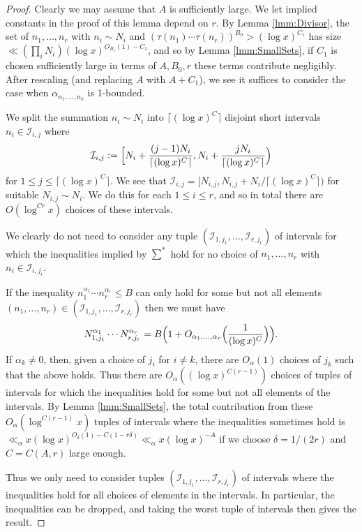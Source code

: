 \documentclass[10pt]{amsart}
\theoremstyle{plain}
\numberwithin{equation}{section}
\begin{document}
\begin{proof}
Clearly we may assume that $A$ is sufficiently large. We let implied constants in the proof of this lemma depend on $r$. By Lemma \ref{lmm:Divisor}, the set of $n_1,\dots,n_r$ with $n_i\sim N_i$ and $(\tau(n_1)\cdots \tau(n_r))^{B_0}>(\log{x})^{C_1}$ has size $\ll (\prod_i N_i)(\log{x})^{O_{B_1}(1)-C_1}$, and so by Lemma \ref{lmm:SmallSets}, if $C_1$ is chosen sufficiently large in terms of $A,B_0,r$ these terms contribute negligibly. After rescaling (and replacing $A$ with $A+C_1$), we see it suffices to consider the case when $\alpha_{n_1,\dots,n_k}$ is 1-bounded.

We split the summation $n_i\sim N_i$ into $\lceil (\log{x})^C\rceil $ disjoint short intervals $n_i\in \mathcal{I}_{i,j}$ where
\[
\mathcal{I}_{i,j}:=\Bigl[N_i+\frac{(j-1)N_i }{\lceil (\log{x})^{C}\rceil},N_i+\frac{j N_i }{\lceil (\log{x})^{C}\rceil}\Bigr)
\]
 for $1\le j\le \lceil(\log{x})^C\rceil$. We see that $\mathcal{I}_{i,j}=[N_{i,j}, N_{i,j}+N_i/\lceil (\log{x})^C\rceil)$ for suitable $N_{i,j}\sim N_i$. We do this for each $1\le i\le r$, and so in total there are $O(\log^{Cr}{x})$ choices of these intervals. 
 
 We clearly do not need to consider any tuple $(\mathcal{I}_{1,j_1},\dots,\mathcal{I}_{r,j_r})$ of intervals for which the inequalities implied by $\sum^*$ hold for no choice of $n_1,\dots,n_r$ with $n_i\in\mathcal{I}_{i,j_i}$. 
 
If the inequality  $n_1^{\alpha_1}\cdots n_r^{\alpha_r}\le B$ can only hold for some but not all elements $(n_1,\dots,n_r)\in (\mathcal{I}_{1,j_1},\dots,\mathcal{I}_{r,j_r})$ then we must have 
\[
N_{1,j_1}^{\alpha_1}\cdots N_{r,j_r}^{\alpha_r}=B\Bigl(1+O_{\alpha_1,\dots,\alpha_r}\Bigl(\frac{1}{(\log{x})^{C}}\Bigr)\Bigr).
\]
If $\alpha_k\ne 0$, then, given a choice of $j_i$ for $i\ne k$, there are $O_\alpha(1)$ choices of $j_k$  such that the above holds. Thus there are $O_\alpha( (\log{x})^{C(r-1)})$ choices of tuples of intervals for which the inequalities hold for some but not all elements of the intervals. By Lemma \ref{lmm:SmallSets}, the total contribution from these $O_\alpha(\log^{C(r-1)}{x})$ tuples of  intervals where the inequalities sometimes hold  is $\ll_\alpha x (\log{x})^{O_\delta(1)-C(1-r\delta)}\ll_\alpha x(\log{x})^{-A}$ if we choose $\delta=1/(2r)$ and $C=C(A,r)$ large enough. 

Thus we only need to consider tuples $(\mathcal{I}_{1,j_1},\dots,\mathcal{I}_{r,j_r})$ of intervals where the inequalities hold for all choices of elements in the intervals. In particular, the inequalities can be dropped, and taking the worst tuple of intervals then gives the result.
\end{proof}
\end{document}
